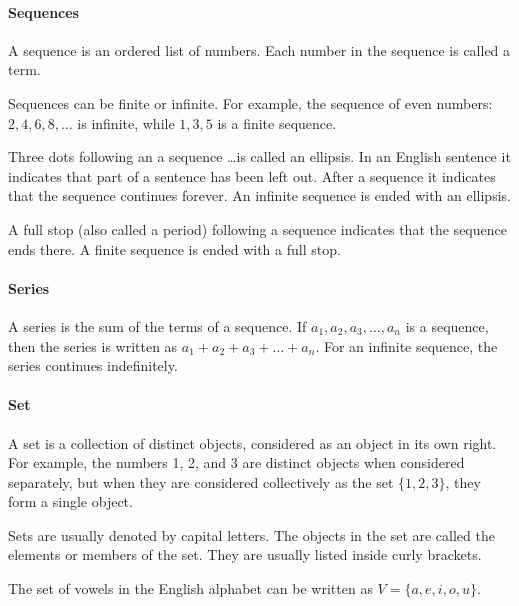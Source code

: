 \documentclass[12pt]{article}
\begin{document}
\paragraph{Sequences}
A sequence is an ordered list of numbers. Each number in the sequence is called a term.

Sequences can be finite or infinite. For example, the sequence of even numbers: \(2, 4, 6, 8, \ldots\) is infinite, while \(1, 3, 5\) is a finite sequence.

Three dots following an a sequence \ldots is called an ellipsis. In an English sentence it indicates that part of a sentence has been left out. After a sequence it indicates that the sequence continues forever. An infinite sequence is ended with an ellipsis.

A full stop (also called a period) following a sequence indicates that the sequence ends there. A finite sequence is ended with a full stop.

\paragraph{Series}
A series is the sum of the terms of a sequence. If \(a_1, a_2, a_3, \ldots, a_n\) is a sequence, then the series is written as \(a_1 + a_2 + a_3 + \ldots + a_n\). For an infinite sequence, the series continues indefinitely.

\paragraph{Set}
A set is a collection of distinct objects, considered as an object in its own right. For example, the numbers 1, 2, and 3 are distinct objects when considered separately, but when they are considered collectively as the set $\{1, 2, 3\}$, they form a single object.

Sets are usually denoted by capital letters. The objects in the set are called the elements or members of the set. They are usually listed inside curly brackets.

The set of vowels in the English alphabet can be written as $V = \{a, e, i, o, u\}$.
\end{document}
